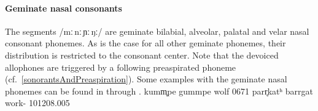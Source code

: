 \paragraph{Geminate nasal consonants}
The segments /mː\,nː\,ɲː\,ŋː/ are geminate bilabial, alveolar, palatal and velar nasal consonant phonemes. 
As is the case for all other geminate phonemes, their distribution is restricted to the consonant center. 
Note that the devoiced allophones are triggered by a following preaspirated phoneme (cf.~\SEC\ref{sonorantsAndPreaspiration}). 
Some examples with the geminate nasal phonemes can be found in  through .
	{ku{mm̥}pe}	{gummpe}	{wolf\BS{}}		{0671}
	{pa{rr̥}katʰ}	{barrgat}	{work-}			{101208}{.005}


